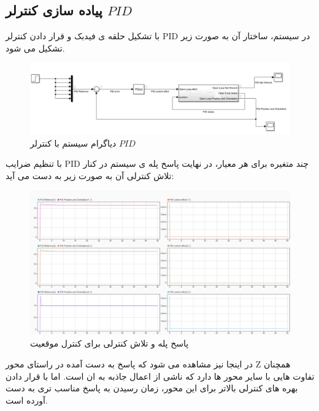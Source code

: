 \subsection{پیاده سازی کنترلر $PID$}
با تشکیل حلقه ی فیدبک و قرار دادن کنترلر PID در سیستم، ساختار آن به صورت زیر تشکیل می شود.
\begin{figure}[H]
	\centering
	\includegraphics[width=1\linewidth]{../img/PID_diagram}
	\caption{دیاگرام سیستم با کنترلر $PID$}
	\label{fig:piddiagram}
\end{figure}
با تنظیم ضرایب PID چند متغیره برای هر معیار، در نهایت پاسخ پله ی سیستم در کنار تلاش کنترلی آن به صورت زیر به دست می آید:
\begin{figure}[H]
	\centering
	\includegraphics[width=0.7\textheight]{../img/PID_Response2_position}
	\caption{پاسخ پله و تلاش کنترلی برای کنترل موقعیت}
	\label{fig:pidresponse_position}
\end{figure}
در اینجا نیز مشاهده می شود که پاسخ به دست آمده در راستای محور Z همچنان تفاوت هایی با سایر محور ها دارد که ناشی از اعمال جاذبه به ان است. اما با قرار دادن بهره های کنترلی بالاتر برای این محور، زمان رسیدن به پاسخ مناسب تری به دست آورده است.
